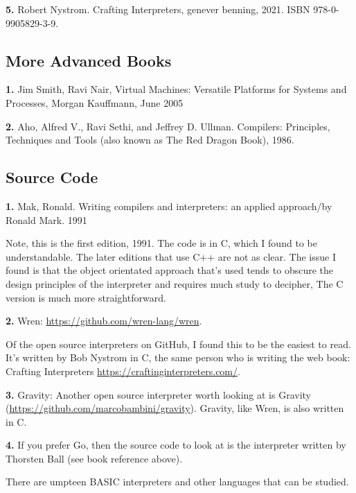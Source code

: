{\bf 5.} Robert Nystrom. Crafting Interpreters, genever benning, 2021. ISBN 978-0-9905829-3-9.

\subsection{More Advanced Books}

{\bf 1.} Jim Smith, Ravi Nair, Virtual Machines: Versatile Platforms for Systems and Processes, Morgan Kauffmann, June 2005

{\bf 2.} Aho, Alfred V., Ravi Sethi, and Jeffrey D. Ullman. Compilers: Principles, Techniques and Tools (also known as The Red Dragon Book), 1986.

\subsection{Source Code}

{\bf 1.} Mak, Ronald. Writing compilers and interpreters: an applied approach/by Ronald Mark. 1991

Note, this is the first edition, 1991. The code is in C, which I found to be understandable. The later editions that use C++ are not as clear. The issue I found is that the object orientated approach that's used tends to obscure the design principles of the interpreter and requires much study to decipher, The C version is much more straightforward.

{\bf 2.} Wren: \url{https://github.com/wren-lang/wren}.

Of the open source interpreters on GitHub, I found this to be the easiest to read. It's written by Bob Nystrom in C, the same person who is writing the web book: Crafting Interpreters \url{https://craftinginterpreters.com/}.

{\bf 3.} Gravity:  Another open source interpreter worth looking at is Gravity (\url{https://github.com/marcobambini/gravity}). Gravity, like Wren, is also written in C.

{\bf 4.}  If you prefer Go, then the source code to look at is the interpreter written by Thorsten Ball (see book reference above).

There are umpteen BASIC interpreters and other languages that can be studied.

\bigskip\medskip

\begin{center}
\end{center} 